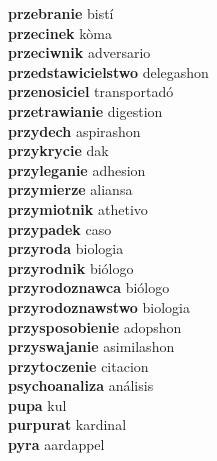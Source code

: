 \textbf{przebranie } bistí \\
\textbf{przecinek } kòma \\
\textbf{przeciwnik } adversario \\
\textbf{przedstawicielstwo } delegashon \\
\textbf{przenosiciel } transportadó \\
\textbf{przetrawianie } digestion \\
\textbf{przydech } aspirashon \\
\textbf{przykrycie } dak \\
\textbf{przyleganie } adhesion \\
\textbf{przymierze } aliansa \\
\textbf{przymiotnik } athetivo \\
\textbf{przypadek } caso \\
\textbf{przyroda } biologia \\
\textbf{przyrodnik } biólogo \\
\textbf{przyrodoznawca } biólogo \\
\textbf{przyrodoznawstwo } biologia \\
\textbf{przysposobienie } adopshon \\
\textbf{przyswajanie } asimilashon \\
\textbf{przytoczenie } citacion \\
\textbf{psychoanaliza } análisis \\
\textbf{pupa } kul \\
\textbf{purpurat } kardinal \\
\textbf{pyra } aardappel \\
